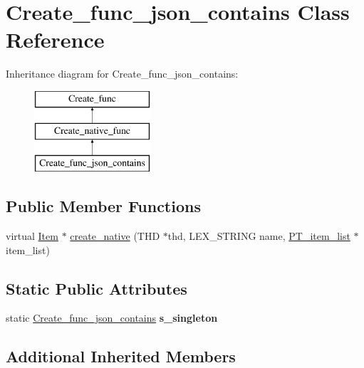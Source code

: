 \hypertarget{classCreate__func__json__contains}{}\section{Create\+\_\+func\+\_\+json\+\_\+contains Class Reference}
\label{classCreate__func__json__contains}
Inheritance diagram for Create\+\_\+func\+\_\+json\+\_\+contains\+:\begin{figure}[H]
\begin{center}
\leavevmode
\includegraphics[height=3.000000cm]{classCreate__func__json__contains}
\end{center}
\end{figure}
\subsection*{Public Member Functions}
\begin{DoxyCompactItemize}
\item 
virtual \mbox{\hyperlink{classItem}{Item}} $\ast$ \mbox{\hyperlink{classCreate__func__json__contains_a6086cefe61628441eddec2f4488dbaea}{create\+\_\+native}} (T\+HD $\ast$thd, L\+E\+X\+\_\+\+S\+T\+R\+I\+NG name, \mbox{\hyperlink{classPT__item__list}{P\+T\+\_\+item\+\_\+list}} $\ast$item\+\_\+list)
\end{DoxyCompactItemize}
\subsection*{Static Public Attributes}
\begin{DoxyCompactItemize}
\item 
\mbox{\label{classCreate__func__json__contains_ab29cdded73e5bd8b1758ad3ebbdda759}} 
static \mbox{\hyperlink{classCreate__func__json__contains}{Create\+\_\+func\+\_\+json\+\_\+contains}} {\bfseries s\+\_\+singleton}
\end{DoxyCompactItemize}
\subsection*{Additional Inherited Members}



